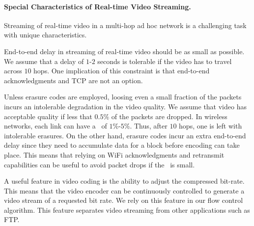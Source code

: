 \documentclass[12pt]{article}
\newenvironment{proof sketch}[1]{\noindent {\emph{Proof sketch of #1:}}}{\hfill \qed}
\newcommand{\PER}{\text{\sc{per}}}
\begin{document}
\paragraph{Special Characteristics of Real-time Video Streaming.}
Streaming of real-time video in a multi-hop ad hoc network is a
challenging task with unique characteristics.
\begin{inparaenum}[(1)]
\item End-to-end delay in streaming of real-time video should be as
  small as possible.  We assume that a delay of $1$-$2$ seconds is
  tolerable if the video has to travel across $10$ hops.  One
  implication of this constraint is that end-to-end acknowledgments and TCP are
  not an option.
\item Unless erasure codes are employed, loosing even a small fraction
  of the packets incurs an intolerable degradation in the video
  quality. We assume that video has acceptable quality if less that
  $0.5\%$ of the packets are dropped. In wireless networks, each link
  can have a \PER\ of $1\%$-$5\%$. Thus, after $10$ hops, one is left
  with intolerable erasures.  On the other hand, erasure codes incur an
  extra end-to-end delay since they need to accumulate data for a
  block before encoding can take place. This means that relying on
  WiFi acknowledgments and retransmit capabilities can be useful to
  avoid packet drops if the \PER\ is small.
\item A useful feature in video coding is the ability to adjust the
  compressed bit-rate. This means that the video encoder can be
  continuously controlled to generate a video stream of a requested
  bit rate. We rely on this feature in our flow control algorithm.
  This feature separates video streaming from other applications such
  as FTP.
\end{inparaenum}
\end{document}
